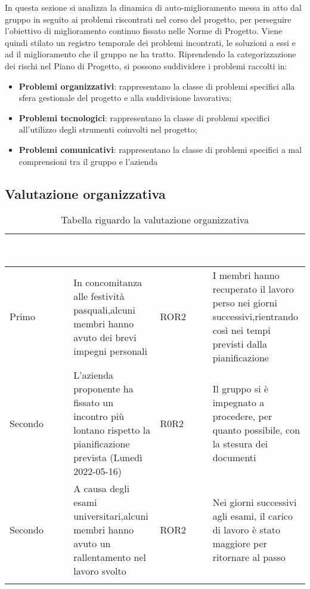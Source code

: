 In questa sezione si analizza la dinamica di auto-miglioramento messa in atto dal gruppo in seguito ai problemi riscontrati nel corso del progetto, per perseguire l'obiettivo di miglioramento continuo fissato nelle Norme di Progetto. Viene quindi stilato un registro temporale dei problemi incontrati, le soluzioni a essi e ad il miglioramento che il gruppo ne ha tratto.
Riprendendo la categorizzazione dei rischi nel Piano di Progetto, si possono suddividere i problemi raccolti in:

\begin{itemize}
	\item \textbf{Problemi organizzativi}: rappresentano la classe di problemi specifici alla sfera gestionale del progetto e alla suddivisione lavorativa;
   \item \textbf{Problemi tecnologici}: rappresentano la classe di problemi specifici all'utilizzo degli strumenti coinvolti nel progetto;
   \item \textbf{Problemi comunicativi}: rappresentano la classe di problemi specifici a mal comprensioni tra il gruppo e l'azienda
\end{itemize}

\subsection{Valutazione organizzativa}
{
    \setlength{\freewidth}{\dimexpr\textwidth-10\tabcolsep}
    \renewcommand{\arraystretch}{1.5}
    \centering
    \setlength{\aboverulesep}{0pt}
    \setlength{\belowrulesep}{0pt}
    \begin{longtable}{C{.25\freewidth} C{.257\freewidth} C{.16\freewidth} C{.4\freewidth}}
       \toprule
    \textcolor{white}{\textbf{Incremento}}&
    \textcolor{white}{\textbf{Problema emerso}}&
    \textcolor{white}{\textbf{Rischio associato}}&
    \textcolor{white}{\textbf{Soluzione migliorativa}}\\	
    \toprule
    \endhead
    
   Primo & In concomitanza alle festività pasquali,alcuni membri hanno avuto dei brevi impegni personali & 
          ROR2 &I membri hanno recuperato il lavoro perso nei giorni successivi,rientrando così nei tempi previsti dalla pianificazione \\
   Secondo & L'azienda proponente ha fissato un incontro più lontano rispetto la pianificazione prevista (Lunedì 2022-05-16) &
            R0R2 & Il gruppo si è impegnato a procedere, per quanto possibile, con la stesura dei documenti \\
   Secondo & A causa degli esami universitari,alcuni membri hanno avuto un rallentamento nel lavoro svolto & 
           ROR2 & Nei giorni successivi agli esami, il carico di lavoro è stato maggiore per ritornare al passo \\
    
   \bottomrule
   \caption{Tabella riguardo la valutazione organizzativa}
   \end{longtable}
}

